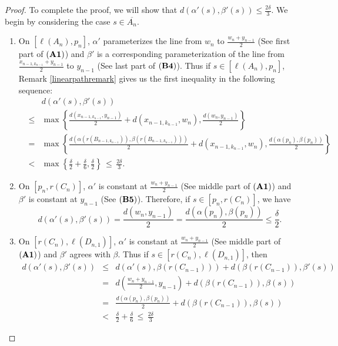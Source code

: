 \documentclass[10pt,a4paper]{amsart}
\newcommand{\ov}{\overline}
\begin{document}
\begin{proof}
To complete the proof, we will show that $d(\alpha '(s),\beta '(s))\leq \frac{2\delta}{3}$. We begin by considering the case $s\in \ov{A_n}$.

\begin{enumerate}
    \item On $[\ell(A_n), p_n]$, $\alpha '$ parameterizes the line from $w_n$ to $\frac{w_n+y_{n-1}}{2}$  (See first part of $\bf (A1)$) and $\beta '$ is a corresponding parameterization of the line from $\frac{x_{n-1, k_{n-1}}+y_{n-1}}{2}$ to $y_{n-1}$  (See last part of $\bf (B4)$). Thus if $s\in [\ell(A_n), p_n]$, Remark \ref{linearpathremark} gives us the first inequality in the following sequence:\\
    \begin{eqnarray*}
     & & d(\alpha '(s),\beta '(s))  \\
    &\leq& \max\left\{\frac{d(x_{n-1, k_{n-1}},y_{n-1})}{2}+d(x_{n-1, k_{n-1}},w_n),\frac{d(w_n,y_{n-1})}{2}\right\}\\
    & =&  \max\left\{\frac{d(\alpha(r(B_{n-1, k_{n-1}})),\beta(r(B_{n-1, k_{n-1}})))}{2}+d(x_{n-1, k_{n-1}},w_n),\frac{d(\alpha(p_n),\beta(p_n))}{2}\right\}\\
    &<& \max\left\{\frac{\delta}{2}+\frac{\delta}{6},\frac{\delta}{2}\right\} \,\leq \, \frac{2\delta}{3}.
    \end{eqnarray*}

    \item On $[p_n,r(C_n)]$, $\alpha '$ is constant at $\frac{w_n+y_{n-1}}{2}$  (See middle part of $\bf (A1)$) and $\beta '$ is constant at $y_{n-1}$  (See $\bf (B5)$). Therefore, if $s\in [p_n,r(C_n)]$, we have \[d(\alpha '(s),\beta '(s))=\frac{d(w_n,y_{n-1})}{2}=\frac{d(\alpha(p_n),\beta(p_n))}{2}\leq\frac{\delta}{2}.\]

    \item On $[r(C_n),\ell(D_{n,1})]$, $\alpha '$ is constant at $\frac{w_n+y_{n-1}}{2}$  (See middle part of $\bf (A1)$) and $\beta '$ agrees with $\beta$. Thus if $s\in [r(C_n),\ell(D_{n,1})]$, then
    \begin{eqnarray*}
    d(\alpha '(s),\beta '(s)) &\leq & d(\alpha '(s),\beta(r(C_{n-1})))+d(\beta(r(C_{n-1})),\beta ' (s))\\
    &= & d\left(\frac{w_n+y_{n-1}}{2},y_{n-1}\right)+d(\beta(r(C_{n-1})),\beta  (s))\\
    &= & \frac{d(\alpha(p_n),\beta(p_n))}{2}+d(\beta(r(C_{n-1})),\beta  (s))\\
    &< & \frac{\delta}{2}+\frac{\delta}{6} \, \leq  \,\frac{2\delta}{3}
    \end{eqnarray*}


\end{enumerate}
\end{proof}
\end{document}
